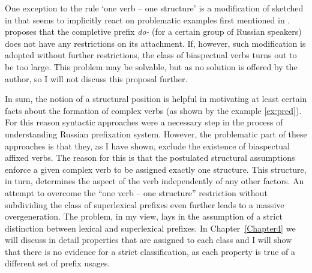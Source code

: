 One exception to the rule `one verb -- one structure' is a modification of \citet{Tatevosov:09} sketched in \citet{Tatevosov:13} that seems to implicitly react on problematic examples first mentioned in \citet{Zinova:12}. \citet{Tatevosov:13} proposes that the completive prefix \textit{do-} (for a certain group of Russian speakers) does not have any restrictions on its attachment. If, however, such modification is adopted without further restrictions, the class of biaspectual verbs turns out to be too large. This problem may be solvable, but as no solution is offered by the author, so I will not discuss this proposal further.

%
In sum, the notion of a structural position is helpful in motivating at least certain facts about the formation of complex verbs (as shown by the example \ref{ex:pred}). For this reason syntactic approaches were a necessary step in the process of understanding Russian prefixation system. However, the problematic part of these approaches is that they, as I have shown, exclude the existence of biaspectual affixed verbs. The reason for this is that the postulated structural assumptions enforce a given complex verb to be assigned exactly one structure. This structure, in turn, determines the aspect of the verb independently of any other factors. An attempt to overcome the ``one verb -- one structure'' restriction without subdividing the class of superlexical prefixes even further  \citep{Tatevosov:13} leads to a massive overgeneration. The problem, in my view, lays in the assumption of a strict distinction between lexical and superlexical prefixes. In Chapter~\ref{Chapter4} we will discuss in detail properties that are assigned to each class and I will show that there is no evidence for a strict classification, as each property is true of a different set of prefix usages.

